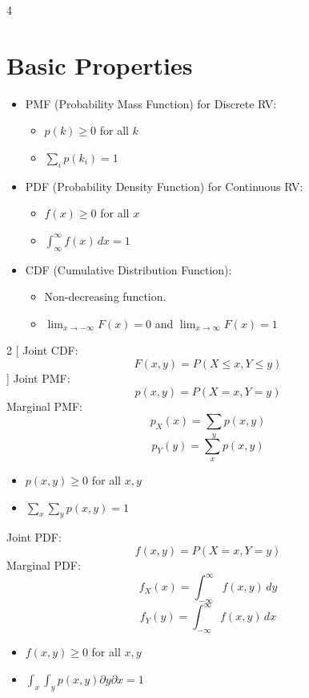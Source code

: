 \documentclass[12pt]{article}
\begin{document}
\begin{multicols*}{4}
    \section{Basic Properties}
    \begin{itemize}[leftmargin=*]
        \item PMF (Probability Mass Function) for Discrete RV:
              \begin{itemize}[leftmargin=*]
                  \item $p(k)\geq 0$ for all $k$
                  \item $\sum_i p(k_i)=1$
              \end{itemize}
        \item PDF (Probability Density Function) for Continuous RV:
              \begin{itemize}[leftmargin=*]
                  \item $f(x)\geq 0$ for all $x$
                  \item $\int_\infty^\infty f(x)\,dx =1$
              \end{itemize}
        \item CDF (Cumulative Distribution Function):
              \begin{itemize}[leftmargin=*]
                  \item Non-decreasing function.
                  \item $\displaystyle\lim_{x\to-\infty}F(x)=0$ and $\displaystyle\lim_{x\to\infty}F(x)=1$
              \end{itemize}
    \end{itemize}
    \begin{tcolorbox}[title=Joint Distribution]
        {
            \setlength{\columnseprule}{1pt}
            \def\columnseprulecolor{\color{black}}
            \begin{multicols*}{2}
                [
                    Joint CDF:
                    $$F(x, y)=P(X\leq x, Y\leq y)$$
                ]
                Joint PMF:
                $$p(x, y)=P(X=x, Y=y)$$
                Marginal PMF:
                $$p_X(x)=\sum_yp(x, y)$$
                $$p_Y(y)=\sum_xp(x, y)$$
                \begin{itemize}[leftmargin=*]
                    \item $p(x, y)\geq 0$ for all $x, y$
                    \item $\sum_x\sum_yp(x, y)=1$
                \end{itemize}
                \vfill
                Joint PDF:
                $$f(x, y)=P(X=x, Y=y)$$
                Marginal PDF:
                $$f_X(x)=\int_{-\infty}^\infty f(x, y)\,dy$$
                $$f_Y(y)=\int_{-\infty}^\infty f(x, y)\,dx$$
                \begin{itemize}[leftmargin=*]
                    \item $f(x, y)\geq 0$ for all $x, y$
                    \item $\int_x\int_yp(x, y)\partial y\partial x=1$
                \end{itemize}
            \end{multicols*}
        }
    \end{tcolorbox}

\end{multicols*}
\end{document}
